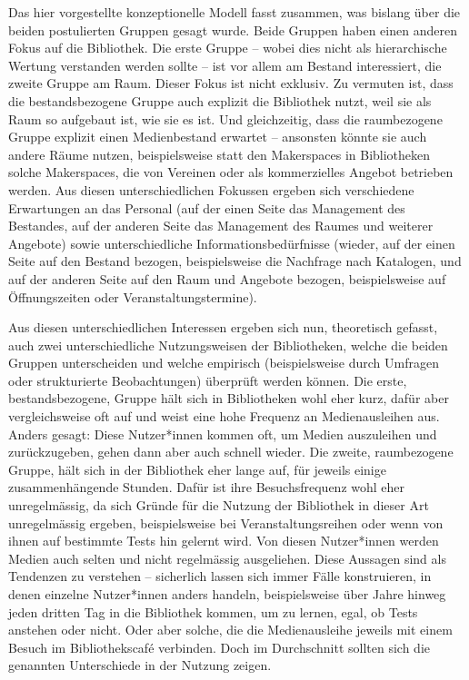\documentclass[a4paper,
fontsize=11pt,
oneside,
numbers=noperiodatend,
parskip=half-,
bibliography=totoc,
final
]{scrartcl}
\begin{document}
Das hier vorgestellte konzeptionelle Modell fasst zusammen, was bislang
über die beiden postulierten Gruppen gesagt wurde. Beide Gruppen haben
einen anderen Fokus auf die Bibliothek. Die erste Gruppe -- wobei dies
nicht als hierarchische Wertung verstanden werden sollte -- ist vor
allem am Bestand interessiert, die zweite Gruppe am Raum. Dieser Fokus
ist nicht exklusiv. Zu vermuten ist, dass die bestandsbezogene Gruppe
auch explizit die Bibliothek nutzt, weil sie als Raum so aufgebaut ist,
wie sie es ist. Und gleichzeitig, dass die raumbezogene Gruppe explizit
einen Medienbestand erwartet -- ansonsten könnte sie auch andere Räume
nutzen, beispielsweise statt den Makerspaces in Bibliotheken solche
Makerspaces, die von Vereinen oder als kommerzielles Angebot betrieben
werden. Aus diesen unterschiedlichen Fokussen ergeben sich verschiedene
Erwartungen an das Personal (auf der einen Seite das Management des
Bestandes, auf der anderen Seite das Management des Raumes und weiterer
Angebote) sowie unterschiedliche Informationsbedürfnisse (wieder, auf
der einen Seite auf den Bestand bezogen, beispielsweise die Nachfrage
nach Katalogen, und auf der anderen Seite auf den Raum und Angebote
bezogen, beispielsweise auf Öffnungszeiten oder Veranstaltungstermine).

Aus diesen unterschiedlichen Interessen ergeben sich nun, theoretisch
gefasst, auch zwei unterschiedliche Nutzungsweisen der Bibliotheken,
welche die beiden Gruppen unterscheiden und welche empirisch
(beispielsweise durch Umfragen oder strukturierte Beobachtungen)
überprüft werden können. Die erste, bestandsbezogene, Gruppe hält sich
in Bibliotheken wohl eher kurz, dafür aber vergleichsweise oft auf und
weist eine hohe Frequenz an Medienausleihen aus. Anders gesagt: Diese
Nutzer*innen kommen oft, um Medien auszuleihen und zurückzugeben, gehen
dann aber auch schnell wieder. Die zweite, raumbezogene Gruppe, hält
sich in der Bibliothek eher lange auf, für jeweils einige
zusammenhängende Stunden. Dafür ist ihre Besuchsfrequenz wohl eher
unregelmässig, da sich Gründe für die Nutzung der Bibliothek in dieser
Art unregelmässig ergeben, beispielsweise bei Veranstaltungsreihen oder
wenn von ihnen auf bestimmte Tests hin gelernt wird. Von diesen
Nutzer*innen werden Medien auch selten und nicht regelmässig
ausgeliehen. Diese Aussagen sind als Tendenzen zu verstehen --
sicherlich lassen sich immer Fälle konstruieren, in denen einzelne
Nutzer*innen anders handeln, beispielsweise über Jahre hinweg jeden
dritten Tag in die Bibliothek kommen, um zu lernen, egal, ob Tests
anstehen oder nicht. Oder aber solche, die die Medienausleihe jeweils
mit einem Besuch im Bibliothekscafé verbinden. Doch im Durchschnitt
sollten sich die genannten Unterschiede in der Nutzung zeigen.
\end{document}
